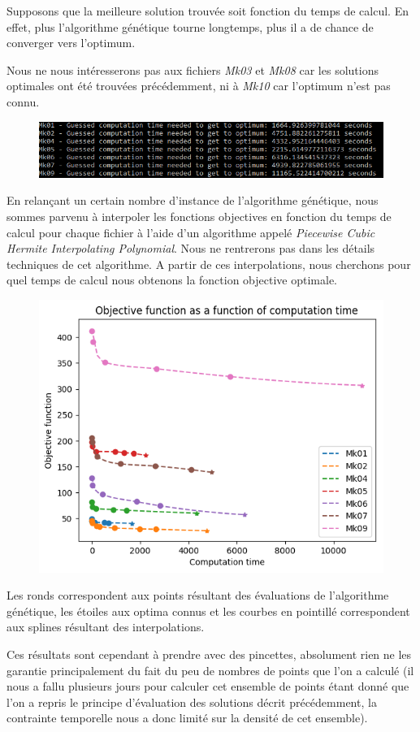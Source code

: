 Supposons que la meilleure solution trouvée soit fonction du temps de calcul. En effet, plus l'algorithme génétique tourne longtemps, plus il a de chance de converger vers l'optimum.

Nous ne nous intéresserons pas aux fichiers \textit{Mk03} et \textit{Mk08} car les solutions optimales ont été trouvées précédemment, ni à \textit{Mk10} car l'optimum n'est pas connu.

\begin{figure}[!h]
    \centering
    \includegraphics[width=\linewidth]{report/Pictures/guessed_computation_time_brandimarte.png}
\end{figure}

En relançant un certain nombre d'instance de l'algorithme génétique, nous sommes parvenu à interpoler les fonctions objectives en fonction du temps de calcul pour chaque fichier à l'aide d'un algorithme appelé \textit{Piecewise Cubic Hermite Interpolating Polynomial}. Nous ne rentrerons pas dans les détails techniques de cet algorithme. A partir de ces interpolations, nous cherchons pour quel temps de calcul nous obtenons la fonction objective optimale.

\begin{figure}[!h]
    \centering
    \includegraphics[width=\linewidth]{report/Pictures/objective_function_as_function_of_time.png}
\end{figure}

Les ronds correspondent aux points résultant des évaluations de l'algorithme génétique, les étoiles aux optima connus et les courbes en pointillé correspondent aux splines résultant des interpolations.

Ces résultats sont cependant à prendre avec des pincettes, absolument rien ne les garantie principalement du fait du peu de nombres de points que l'on a calculé (il nous a fallu plusieurs jours pour calculer cet ensemble de points étant donné que l'on a repris le principe d'évaluation des solutions décrit précédemment, la contrainte temporelle nous a donc limité sur la densité de cet ensemble).